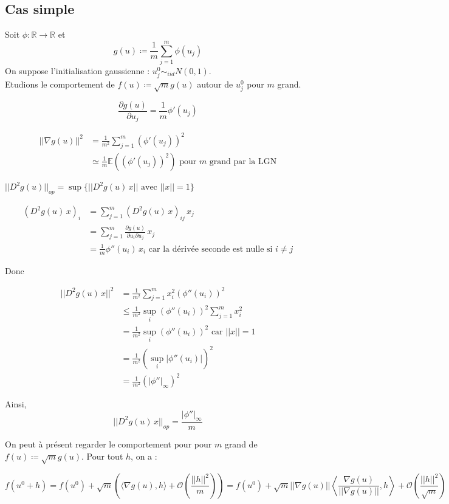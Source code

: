 \documentclass[a4paper, 11pt, french]{article}
\theoremstyle{definition}
\begin{document}
	\subsection{Cas simple}
	
	Soit $\phi : \mathbb{R} \to \mathbb{R}$ et \[g(u) \coloneqq \frac{1}{m} \sum_{j=1}^{m} \phi(u_j)\] On suppose l'initialisation gaussienne : $u_j^0 \sim_{iid} N(0,1)$. \\
	
	Etudions le comportement de $f(u) \coloneqq \sqrt{m} g(u)$ autour de $u_j^0$ pour $m$ grand.
	
	\[\frac{\partial g(u)}{\partial u_j} = \frac{1}{m} \phi '(u_j)\]
	
	\begin{align}
		||\nabla g(u) ||^2 &= \frac{1}{m^2} \sum_{j=1}^{m} (\phi '(u_j))^2 \\
		&\simeq \frac{1}{m} \mathbb{E}((\phi '(u_j))^2) \text{ pour $m$ grand par la LGN}
	\end{align}

	$||D^2 g(u)||_{op} = \sup \{||D^2 g(u) \, x|| \text{ avec } ||x|| = 1\}$
	
	\begin{align}
		(D^2 g(u) \, x)_i &= \sum_{j=1}^{m} (D^2 g(u) \, x)_{ij} \, x_j \\
		&= \sum_{j=1}^{m} \frac{\partial g(u)}{\partial u_i \partial u_j} \, x_j \\
		&= \frac{1}{m} \phi ''(u_i) \, x_i \text{ car la dérivée seconde est nulle si $i \neq j$}
	\end{align}
	
	Donc
	
	\begin{align*}
		||D^2 g(u) \, x||^2 &= \frac{1}{m^2} \sum_{j=1}^{m} x_i^2 (\phi ''(u_i))^2 \\
		&\leq \frac{1}{m^2} \sup_i (\phi ''(u_i))^2 \sum_{j=1}^{m} x_i^2 \\
		&= \frac{1}{m^2} \sup_i (\phi ''(u_i))^2 \text{ car $||x|| = 1$} \\
		&= \frac{1}{m^2} (\sup_i |\phi ''(u_i)|)^2 \\
		&= \frac{1}{m^2} (|\phi ''|_{\infty})^2
	\end{align*}
	
	Ainsi, \[||D^2 g(u) \, x||_{op} = \frac{|\phi ''|_{\infty}}{m}\]
	
	On peut à présent regarder le comportement pour pour $m$ grand de $f(u) \coloneqq \sqrt m g(u)$. Pour tout $h$, on a :
	
	\[f(u^0 + h) = f(u^0) + \sqrt m \left(\langle \nabla g(u), h \rangle + \mathcal{O}\left(\frac{||h||^2}{m}\right) \right) =  f(u^0) + \sqrt m ||\nabla g(u)|| \left \langle \frac{\nabla g(u)}{||\nabla g(u)||}, h \right \rangle  + \mathcal{O}\left(\frac{||h||^2}{\sqrt m}\right) \]
	
\end{document}

